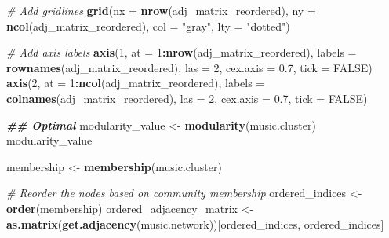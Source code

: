 \documentclass[
]{article}
\newenvironment{Shaded}{\begin{snugshade}}{\end{snugshade}}
\newcommand{\AttributeTok}[1]{\textcolor[rgb]{0.13,0.29,0.53}{#1}}
\newcommand{\CommentTok}[1]{\textcolor[rgb]{0.56,0.35,0.01}{\textit{#1}}}
\newcommand{\ConstantTok}[1]{\textcolor[rgb]{0.56,0.35,0.01}{#1}}
\newcommand{\DecValTok}[1]{\textcolor[rgb]{0.00,0.00,0.81}{#1}}
\newcommand{\DocumentationTok}[1]{\textcolor[rgb]{0.56,0.35,0.01}{\textbf{\textit{#1}}}}
\newcommand{\FloatTok}[1]{\textcolor[rgb]{0.00,0.00,0.81}{#1}}
\newcommand{\FunctionTok}[1]{\textcolor[rgb]{0.13,0.29,0.53}{\textbf{#1}}}
\newcommand{\NormalTok}[1]{#1}
\newcommand{\OtherTok}[1]{\textcolor[rgb]{0.56,0.35,0.01}{#1}}
\newcommand{\SpecialCharTok}[1]{\textcolor[rgb]{0.81,0.36,0.00}{\textbf{#1}}}
\newcommand{\StringTok}[1]{\textcolor[rgb]{0.31,0.60,0.02}{#1}}
\begin{document}
\begin{Shaded}
\begin{Highlighting}[]
\CommentTok{\# Add gridlines}
\FunctionTok{grid}\NormalTok{(}\AttributeTok{nx =} \FunctionTok{nrow}\NormalTok{(adj\_matrix\_reordered), }\AttributeTok{ny =} \FunctionTok{ncol}\NormalTok{(adj\_matrix\_reordered), }\AttributeTok{col =} \StringTok{"gray"}\NormalTok{, }\AttributeTok{lty =} \StringTok{"dotted"}\NormalTok{)}

\CommentTok{\# Add axis labels}
\FunctionTok{axis}\NormalTok{(}\DecValTok{1}\NormalTok{, }\AttributeTok{at =} \DecValTok{1}\SpecialCharTok{:}\FunctionTok{nrow}\NormalTok{(adj\_matrix\_reordered), }\AttributeTok{labels =} \FunctionTok{rownames}\NormalTok{(adj\_matrix\_reordered), }\AttributeTok{las =} \DecValTok{2}\NormalTok{, }\AttributeTok{cex.axis =} \FloatTok{0.7}\NormalTok{, }\AttributeTok{tick =} \ConstantTok{FALSE}\NormalTok{)}
\FunctionTok{axis}\NormalTok{(}\DecValTok{2}\NormalTok{, }\AttributeTok{at =} \DecValTok{1}\SpecialCharTok{:}\FunctionTok{ncol}\NormalTok{(adj\_matrix\_reordered), }\AttributeTok{labels =} \FunctionTok{colnames}\NormalTok{(adj\_matrix\_reordered), }\AttributeTok{las =} \DecValTok{2}\NormalTok{, }\AttributeTok{cex.axis =} \FloatTok{0.7}\NormalTok{, }\AttributeTok{tick =} \ConstantTok{FALSE}\NormalTok{)}

\DocumentationTok{\#\# Optimal}
\NormalTok{modularity\_value }\OtherTok{\textless{}{-}} \FunctionTok{modularity}\NormalTok{(music.cluster)}
\NormalTok{modularity\_value}

\NormalTok{membership }\OtherTok{\textless{}{-}} \FunctionTok{membership}\NormalTok{(music.cluster)}

\CommentTok{\# Reorder the nodes based on community membership}
\NormalTok{ordered\_indices }\OtherTok{\textless{}{-}} \FunctionTok{order}\NormalTok{(membership)}
\NormalTok{ordered\_adjacency\_matrix }\OtherTok{\textless{}{-}} \FunctionTok{as.matrix}\NormalTok{(}\FunctionTok{get.adjacency}\NormalTok{(music.network))[ordered\_indices, ordered\_indices]}


\end{Highlighting}
\end{Shaded}
\end{document}
